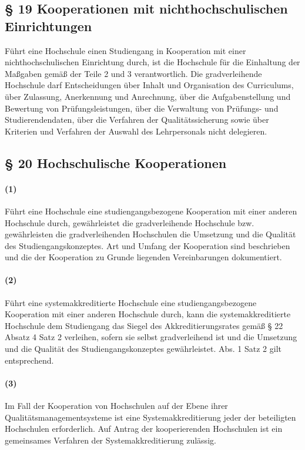 \documentclass[a4paper]{scrartcl}
\begin{document}
\subsection{§ 19 Kooperationen mit nichthochschulischen Einrichtungen}
Führt eine Hochschule einen Studiengang in Kooperation mit einer nichthochschulischen Einrichtung durch, ist die Hochschule für die Einhaltung der Maßgaben gemäß der Teile 2 und 3 verantwortlich. Die gradverleihende Hochschule darf Entscheidungen über Inhalt und Organisation des Curriculums, über Zulassung, Anerkennung und Anrechnung, über die Aufgabenstellung und Bewertung von Prüfungsleistungen, über die Verwaltung von Prüfungs- und Studierendendaten, über die Verfahren der Qualitätssicherung sowie über Kriterien und Verfahren der Auswahl des Lehrpersonals nicht delegieren.
\subsection{§ 20 Hochschulische Kooperationen}
\label{todo:AbHierLinksKontrolliert}
\paragraph{(1)} Führt eine Hochschule eine studiengangsbezogene Kooperation mit einer anderen Hochschule durch, gewährleistet die gradverleihende Hochschule bzw. gewährleisten die gradverleihenden Hochschulen die Umsetzung und die Qualität des Studiengangskonzeptes. Art und Umfang der Kooperation sind beschrieben und die der Kooperation zu Grunde liegenden Vereinbarungen dokumentiert.
\paragraph{(2)} Führt eine systemakkreditierte Hochschule eine studiengangsbezogene Kooperation mit einer anderen Hochschule durch, kann die systemakkreditierte Hochschule dem Studiengang das Siegel des Akkreditierungsrates gemäß § 22 Absatz 4 Satz 2 verleihen, sofern sie selbst gradverleihend ist und die Umsetzung und die Qualität des
Studiengangskonzeptes gewährleistet. Abs. 1 Satz 2 gilt entsprechend.
\paragraph{(3)} Im Fall der Kooperation von Hochschulen auf der Ebene ihrer Qualitätsmanagementsysteme ist eine Systemakkreditierung jeder der beteiligten Hochschulen erforderlich. Auf Antrag der kooperierenden Hochschulen ist ein gemeinsames Verfahren der Systemakkreditierung zulässig.
\end{document}
